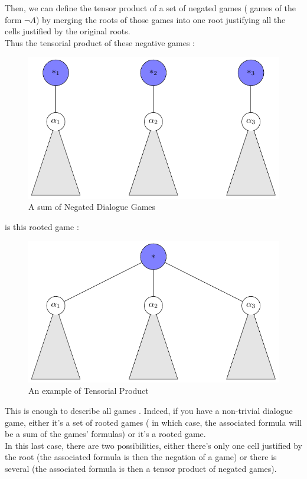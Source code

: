 \documentclass[a4paper,UKenglish]{lipics}
\begin{document}
Then, we can define the tensor product of a set of negated games ( games of the form $\neg A$) by merging the roots of those games into one root justifying all the cells justified by the original roots.\\
Thus the tensorial product of these negative games : 
\begin{figure}[H]\centering\includegraphics[scale=0.6]{dialoguegame4.pdf} \caption{A sum of Negated Dialogue Games} \end{figure}
is this rooted game :

\begin{figure}[H]\centering\includegraphics[scale=0.6]{dialoguegame5.pdf} \caption{An example of Tensorial Product} \end{figure}
This is enough to describe all games . Indeed, if you have a non-trivial dialogue game, either it's a set of rooted games ( in which case, the associated formula will be a sum of the games' formulas) or it's a rooted game. \\In this last case, there are two possibilities, either there's only one cell justified by the root (the associated formula is then the negation of a game) or there is several (the associated formula is then a tensor product of negated games).\\ 
\end{document}
